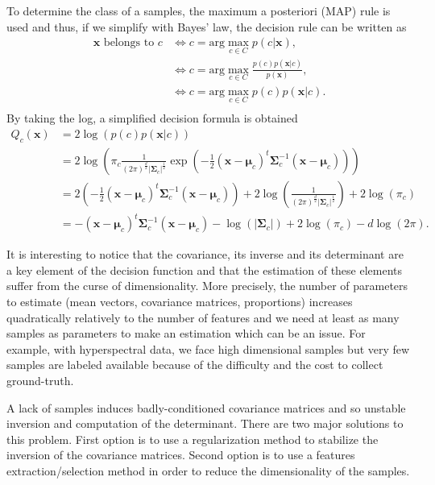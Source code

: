 \documentclass[a4paper,11pt,DIV=16,abstracton]{scrartcl}
\begin{document}
    To determine the class of a samples, the maximum a posteriori (MAP) rule is used and thus, if we simplify with Bayes' law, the decision rule can be written as
    \begin{align*}
        \mathbf{x} \text{ belongs to } c &\Leftrightarrow c = \text{arg} \max_{c \in C} p(c|\mathbf{x}),\\
                                         &\Leftrightarrow c = \text{arg} \max_{c \in C} \frac{p(c) p(\mathbf{x}|c)}{p(\mathbf{x})},\\
                                         &\Leftrightarrow c = \text{arg} \max_{c \in C} p(c) p(\mathbf{x}|c).\\
    \end{align*}
    By taking the log, a simplified decision formula is obtained
    \begin{align}
        Q_c(\mathbf{x})
        &= 2 \log \left( p(c) p(\mathbf{x}|c) \right) \nonumber \\
        &= 2 \log \left( \pi_c \frac{1}{(2\pi)^{\frac{d}{2}} |\boldsymbol{\Sigma}_c|^{\frac{1}{2}}} \exp \left( -\frac{1}{2} (\mathbf{x} - \boldsymbol{\mu}_c)^t \boldsymbol{\Sigma}_c^{-1} (\mathbf{x} - \boldsymbol{\mu}_c) \right) \right) \nonumber \\
        &= 2 \left( -\frac{1}{2} (\mathbf{x} - \boldsymbol{\mu}_c)^t \boldsymbol{\Sigma}_c^{-1} (\mathbf{x} - \boldsymbol{\mu}_c) \right) + 2 \log \left( \frac{1}{(2\pi)^{\frac{d}{2}} |\boldsymbol{\Sigma}_c|^{\frac{1}{2}}} \right) + 2 \log (\pi_c) \nonumber \\
        &= - (\mathbf{x} - \boldsymbol{\mu}_c)^t \boldsymbol{\Sigma}_c^{-1} (\mathbf{x} - \boldsymbol{\mu}_c) - \log (|\boldsymbol{\Sigma}_c|) + 2 \log (\pi_c) - d \log (2\pi).
        \label{eq:decision}
    \end{align}

    It is interesting to notice that the covariance, its inverse and its determinant are a key element of the decision function and that the estimation of these elements suffer from the curse of dimensionality. More precisely, the number of parameters to estimate (mean vectors, covariance matrices, proportions) increases quadratically relatively to the number of features and we need at least as many samples as parameters to make an estimation which can be an issue. For example, with hyperspectral data, we face high dimensional samples but very few samples are labeled available because of the difficulty and the cost to collect ground-truth.

    A lack of samples induces badly-conditioned covariance matrices and so unstable inversion and computation of the determinant. There are two major solutions to this problem. First option is to use a regularization method to stabilize the inversion of the covariance matrices. Second option is to use a features extraction/selection method in order to reduce the dimensionality of the samples.
\end{document}
